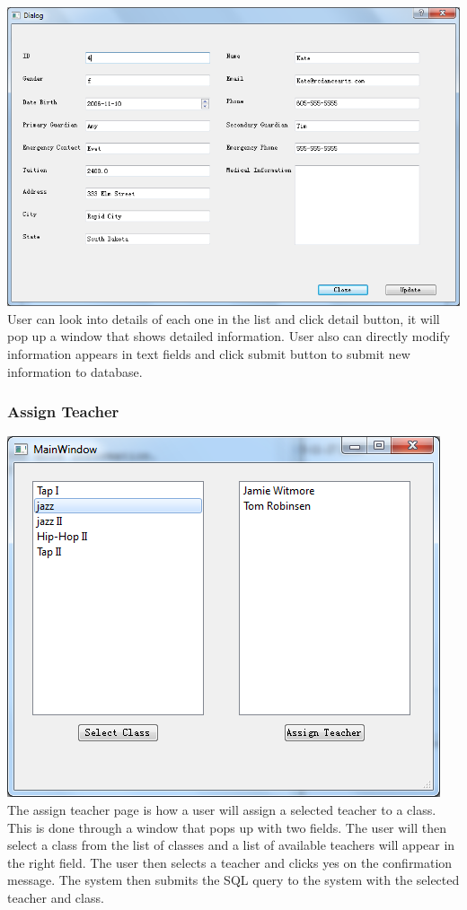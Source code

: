 \includegraphics[scale=0.5]{pics/detail.png}\\
User can look into details of each one in the list and click detail button, it will pop up a window that shows detailed information. User also can directly modify information appears in text fields and click submit button to submit new information to database.

\subsubsection{Assign Teacher}
\includegraphics[scale=0.5]{pics/assign_teacher.png}\\
The assign teacher page is how a user will assign a selected teacher to a class. This is done through a window that pops up with two fields. The user will then select a class from the list of classes and a list of available teachers will appear in the right field. The user then selects a teacher and clicks yes on the confirmation message. The system then submits the SQL query to the system with the selected teacher and class. 


